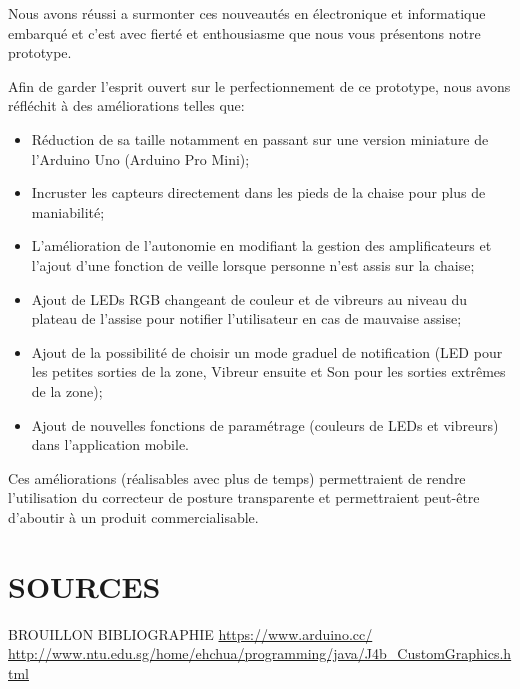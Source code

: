 \documentclass{polytech/polytech}
\begin{document}
Nous avons réussi a surmonter ces nouveautés en électronique et informatique embarqué et c'est avec fierté et enthousiasme que nous vous présentons notre prototype.

Afin de garder l'esprit ouvert sur le perfectionnement de ce prototype, nous avons réfléchit à des améliorations telles que:


\begin{itemize}
\item Réduction de sa taille notamment en passant sur une version miniature de l'Arduino Uno (Arduino Pro Mini);
\item Incruster les capteurs directement dans les pieds de la chaise pour plus de maniabilité;
\item L'amélioration de l'autonomie en modifiant la gestion des amplificateurs et l'ajout d'une fonction de veille lorsque personne n'est assis sur la chaise;
\item Ajout de LEDs RGB changeant de couleur et de vibreurs au niveau du plateau de l'assise pour notifier l'utilisateur en cas de mauvaise assise;
\item Ajout de la possibilité de choisir un mode graduel de notification (LED pour les petites sorties de la zone, Vibreur ensuite et Son pour les sorties extrêmes de la zone);
\item Ajout de nouvelles fonctions de paramétrage (couleurs de LEDs et vibreurs) dans l'application mobile.
\end{itemize}

Ces améliorations (réalisables avec plus de temps) permettraient de rendre l'utilisation du correcteur de posture transparente et permettraient peut-être d'aboutir à un produit commercialisable.



\chapter{SOURCES}
BROUILLON BIBLIOGRAPHIE
\url{https://www.arduino.cc/}
\url{http://www.ntu.edu.sg/home/ehchua/programming/java/J4b_CustomGraphics.html}






\end{document}
